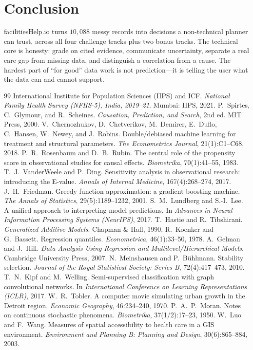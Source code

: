 \documentclass[11pt]{article}
\begin{document}
\section{Conclusion}
facilitiesHelp.io turns $10{,}088$ messy records into decisions a non-technical planner can trust, across all four challenge tracks plus two bonus tracks. The technical core is honesty: grade on cited evidence, communicate uncertainty, separate a real care gap from missing data, and distinguish a correlation from a cause. The hardest part of ``for good'' data work is not prediction---it is telling the user what the data can and cannot support.

\begin{thebibliography}{99}\small
{} International Institute for Population Sciences (IIPS) and ICF. \emph{National Family Health Survey (NFHS-5), India, 2019--21}. Mumbai: IIPS, 2021.
 P.~Spirtes, C.~Glymour, and R.~Scheines. \emph{Causation, Prediction, and Search}, 2nd ed. MIT Press, 2000.
 V.~Chernozhukov, D.~Chetverikov, M.~Demirer, E.~Duflo, C.~Hansen, W.~Newey, and J.~Robins. Double/debiased machine learning for treatment and structural parameters. \emph{The Econometrics Journal}, 21(1):C1--C68, 2018.
 P.~R.~Rosenbaum and D.~B.~Rubin. The central role of the propensity score in observational studies for causal effects. \emph{Biometrika}, 70(1):41--55, 1983.
 T.~J.~VanderWeele and P.~Ding. Sensitivity analysis in observational research: introducing the E-value. \emph{Annals of Internal Medicine}, 167(4):268--274, 2017.
 J.~H.~Friedman. Greedy function approximation: a gradient boosting machine. \emph{The Annals of Statistics}, 29(5):1189--1232, 2001.
 S.~M.~Lundberg and S.-I.~Lee. A unified approach to interpreting model predictions. In \emph{Advances in Neural Information Processing Systems (NeurIPS)}, 2017.
 T.~Hastie and R.~Tibshirani. \emph{Generalized Additive Models}. Chapman \& Hall, 1990.
 R.~Koenker and G.~Bassett. Regression quantiles. \emph{Econometrica}, 46(1):33--50, 1978.
 A.~Gelman and J.~Hill. \emph{Data Analysis Using Regression and Multilevel/Hierarchical Models}. Cambridge University Press, 2007.
 N.~Meinshausen and P.~B\"uhlmann. Stability selection. \emph{Journal of the Royal Statistical Society: Series B}, 72(4):417--473, 2010.
 T.~N.~Kipf and M.~Welling. Semi-supervised classification with graph convolutional networks. In \emph{International Conference on Learning Representations (ICLR)}, 2017.
 W.~R.~Tobler. A computer movie simulating urban growth in the Detroit region. \emph{Economic Geography}, 46:234--240, 1970.
 P.~A.~P.~Moran. Notes on continuous stochastic phenomena. \emph{Biometrika}, 37(1/2):17--23, 1950.
 W.~Luo and F.~Wang. Measures of spatial accessibility to health care in a GIS environment. \emph{Environment and Planning B: Planning and Design}, 30(6):865--884, 2003.
\end{thebibliography}
\end{document}
